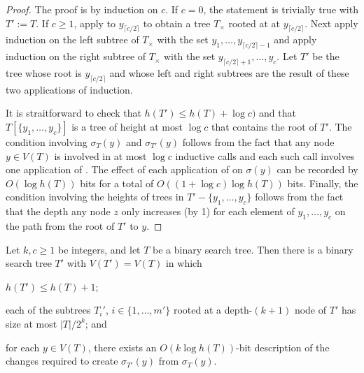 \documentclass[kpfonts]{patmorin}
\begin{document}
\begin{proof}
  The proof is by induction on $c$.  If $c=0$, the statement is trivially true with $T':=T$.  If $c\ge 1$,  apply  to $y_{\lceil c/2\rceil}$ to obtain a tree $T_\times$ rooted at at $y_{\lceil c/2\rceil}$.  Next apply induction on the left subtree of $T_\times$ with the set $y_1,\ldots,y_{\lceil c/2\rceil -1}$ and apply induction on the right subtree of $T_\times$ with the set $y_{\lceil c/2\rceil +1},\ldots,y_c$.  Let $T'$ be the tree whose root is $y_{\lceil c/2\rceil}$ and whose left and right subtrees are the result of these two applications of induction.
  
  It is straitforward to check that $h(T')\le h(T)+\log c)$ and that $T[\{y_1,\ldots,y_c\}]$ is a tree of height at most $\log c$ that contains the root of $T'$.  The condition involving $\sigma_T(y)$ and $\sigma_{T'}(y)$ follows from the fact that any node $y\in V(T)$ is involved in at most $\log c$ inductive calls and each such call involves one application of .  The effect of each application of  on $\sigma(y)$ can be recorded by $O(\log h(T))$ bits for a total of $O((1+\log c)\log h(T))$ bits.  Finally, the condition involving the heights of trees in $T'-\{y_1,\ldots,y_c\}$ follows from the fact that the depth any node $z$ only increases (by 1) for each element of $y_1,\ldots,y_c$ on the path from the root of $T'$ to $y$.
\end{proof}

\begin{lem}
  Let $k,c\ge 1$ be integers, and let $T$ be a binary search tree.  Then there is a binary search tree $T'$ with $V(T')=V(T)$ in which
  \begin{compactenum}
    \item $h(T')\le h(T)+1$; 

    \item  each of the subtrees $T_i'$, $i\in\{1,\ldots,m'\}$ rooted at a depth-$(k+1)$ node of $T'$ has size at most $|T|/2^k$; and
    
    \item for each $y\in V(T)$, there exists an $O(k\log h(T))$-bit description of the changes required to create $\sigma_{T'}(y)$ from $\sigma_T(y)$.
  \end{compactenum}
\end{lem}
\end{document}
